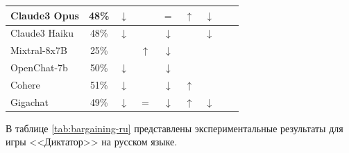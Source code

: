 \begin{longtable}[c]{|p{3.8cm}|c|c|c|c|c|c|c|c|}
Claude3 Opus & 48\% & $\downarrow$ & \bluearrow{$\downarrow$} & $=$ & $\uparrow$ & $\downarrow$ \\

\hline

Claude3 Haiku & 48\% & $\downarrow$ & \bluearrow{$\downarrow$} & $\downarrow$ & \bluearrow{$\downarrow$} & $\downarrow$ \\

\hline

Mixtral-8x7B & 25\% & \bluearrow{$\uparrow$} & $\uparrow$ & $\downarrow$ & \bluearrow{$\downarrow$} & \bluearrow{$\uparrow$} \\

\hline

OpenChat-7b & 50\% & $\downarrow$ & \bluearrow{$\downarrow$} & $\downarrow$ &  \bluearrow{$\downarrow$} &  \bluearrow{$\uparrow$} \\

\hline

Cohere & 51\% & $\downarrow$ & \bluearrow{$\downarrow$} &  $\downarrow$ &  $\uparrow$ & \bluearrow{$\uparrow$} \\

\hline

Gigachat & 49\%  & $\downarrow$ & $=$ &  $\downarrow$ & $\uparrow$ & $\downarrow$ \\

\end{longtable}


В таблице \ref{tab:bargaining-ru} представлены экспериментальные результаты для игры <<Диктатор>> на русском языке. 

